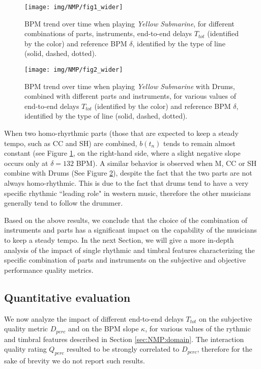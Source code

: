\begin{figure}[!tb]
  \centering
  \texttt{[image: img/NMP/fig1\_wider]}
  \caption{BPM trend over time when playing \textit{Yellow Submarine}, for different combinations of parts, instruments,  end-to-end delays $T_{tot}$ (identified by the color) and reference BPM $\delta$, identified by the type of line (solid, dashed, dotted).}
   \label{fig:NMP:melody} 
\end{figure}
\begin{figure}[!tb]
  \centering
  \texttt{[image: img/NMP/fig2\_wider]}
  \caption{BPM trend over time when playing \textit{Yellow Submarine} with Drums, combined with different parts and instruments, for various values of end-to-end delays $T_{tot}$ (identified by the color) and reference BPM $\delta$, identified by the type of line (solid, dashed, dotted).}
 \label{fig:NMP:drums} 
\end{figure}


%


When two homo-rhyrthmic parts (those that are expected to keep a steady tempo, such as CC and SH) are combined, $b(t_n)$ tends to remain almost constant (see Figure \ref{fig:NMP:melody}, on the right-hand side, where a slight negative slope occurs only at $\delta=132$ BPM).
A similar behavior is observed when M, CC or SH combine with Drums (See Figure \ref{fig:NMP:drums}), despite the fact that the two parts are not always homo-rhythmic. This is due to the fact that drums tend to have a very specific rhythmic ``leading role" in western music, therefore the other musicians generally tend to follow the drummer.

Based on the above results, we conclude that the choice of the combination of instruments and parts has a significant impact on the capability of the musicians to keep a steady tempo. 
In the next Section, we will give a more in-depth analysis of the impact of single rhythmic and timbral features characterizing the specific combination of parts and instruments on the subjective and objective performance quality metrics.

\subsection{Quantitative evaluation}\label{sec:NMP:quantResults}
We now analyze the impact of different end-to-end delays $T_{tot}$ on the subjective quality metric $D_{perc}$ and on the BPM slope $\kappa$, for various values of the rythmic and timbral features described in Section \ref{sec:NMP:domain}. The interaction quality rating $Q_{perc}$ resulted to be strongly correlated to $D_{perc}$, therefore for the sake of brevity we do not report such results.



